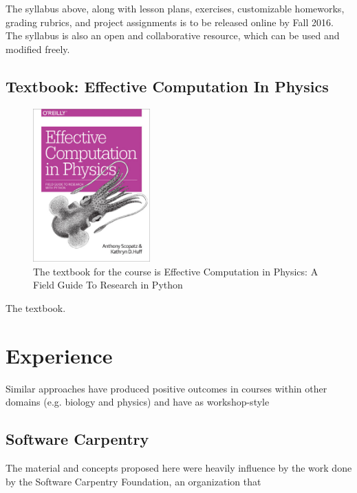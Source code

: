 \documentclass{anstrans}
\begin{document}
The syllabus above, along with lesson plans, exercises, customizable homeworks,
grading rubrics, and project assignments is to be released online by Fall 2016.
The syllabus is also an open and collaborative resource, which can be used
and modified freely.

\subsection{Textbook: Effective Computation In Physics}

\begin{figure}[htbp!]
\begin{center}
\includegraphics[width=0.4\textwidth]{ecip.eps}
\end{center}
\caption{The textbook for the course is Effective Computation in Physics: A Field Guide To Research in Python}
\label{fig:book}
\end{figure}

The textbook.


\section{Experience}

Similar approaches have produced positive outcomes in courses within other domains
(e.g. biology 
\cite{matthews_using_2010,honts_evolving_2003,tjaden_multidisciplinary_2007,libeskind-hadas_first_2013} 
and physics\cite{baxter_scientific_2014,myers_python_2007}) and have as workshop-style  
\cite{huff_rapid_2011,wilson_software_2006,wilson_software_2014}

\subsection{Software Carpentry}

The material and concepts proposed here were heavily influence by the work done
by the Software Carpentry Foundation, an organization that
\end{document}
